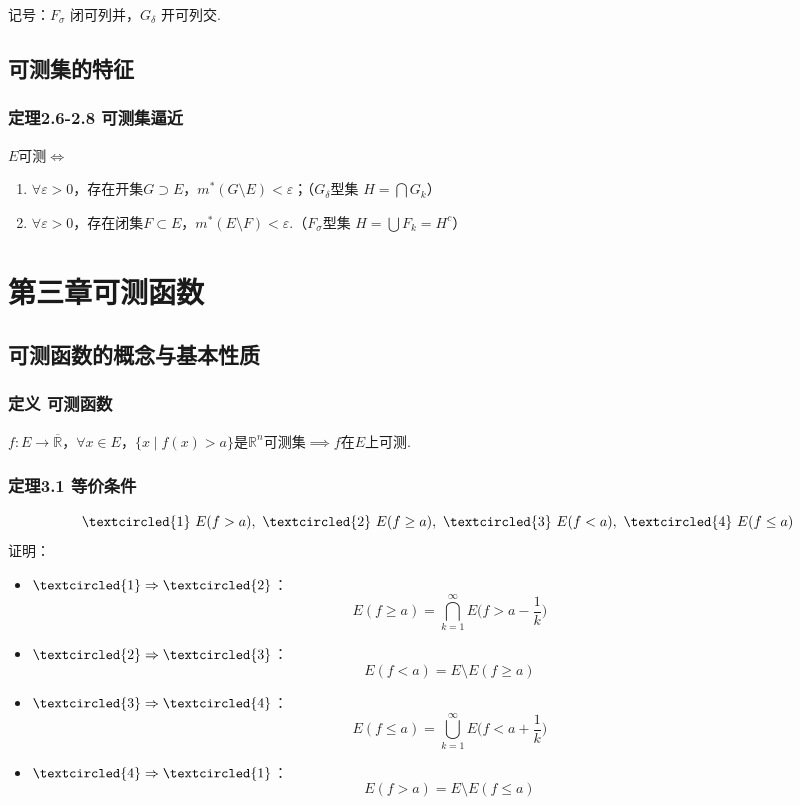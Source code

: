 \documentclass{article}
\begin{document}
	记号：$F_\sigma$ 闭可列并，$G_\delta$ 开可列交.
	
	\subsection{可测集的特征}
	\subsubsection{定理2.6-2.8 可测集逼近}
	$E$可测$\iff$
	\begin{enumerate}
		\item $\forall \varepsilon>0$，存在开集$G\supset E$，$m^*(G\setminus E)<\varepsilon$；（$G_\delta$型集 $H=\bigcap G_k$）
		\item $\forall \varepsilon>0$，存在闭集$F\subset E$，$m^*(E\setminus F)<\varepsilon$.（$F_\sigma$型集 $H=\bigcup F_k=H^c$）
	\end{enumerate}
	
	\section{第三章\quad 可测函数}
	\subsection{可测函数的概念与基本性质}
	\subsubsection{定义 可测函数}
	$f:E\to\overline{\mathbb{R}}$，$\forall x\in E$，$\{x\mid f(x)>a\}$是$\mathbb{R}^n$可测集$\implies f$在$E$上可测.
	
	\subsubsection{定理3.1 等价条件}
	\[
	\textcircled{1}\ E(f>a),\ \textcircled{2}\ E(f\ge a),\ \textcircled{3}\ E(f<a),\ \textcircled{4}\ E(f\le a)
	\]
	证明：
	\begin{itemize}
		\item $\textcircled{1}\Rightarrow\textcircled{2}$：
		\[
		E(f\ge a)=\bigcap_{k=1}^{\infty}E\Big(f>a-\frac1k\Big)
		\]
		\item $\textcircled{2}\Rightarrow\textcircled{3}$：
		\[
		E(f<a)=E\setminus E(f\ge a)
		\]
		\item $\textcircled{3}\Rightarrow\textcircled{4}$：
		\[
		E(f\le a)=\bigcup_{k=1}^{\infty}E\Big(f<a+\frac1k\Big)
		\]
		\item $\textcircled{4}\Rightarrow\textcircled{1}$：
		\[
		E(f>a)=E\setminus E(f\le a)
		\]
	\end{itemize}
	
\end{document}
